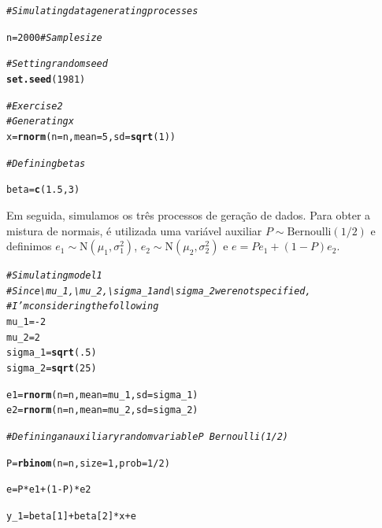 \documentclass{homework}\usepackage[]{graphicx}\usepackage[]{color}
\makeatletter
\newcommand{\hlnum}[1]{\textcolor[rgb]{0.686,0.059,0.569}{#1}}%
\newcommand{\hlcom}[1]{\textcolor[rgb]{0.678,0.584,0.686}{\textit{#1}}}%
\newcommand{\hlopt}[1]{\textcolor[rgb]{0,0,0}{#1}}%
\newcommand{\hlstd}[1]{\textcolor[rgb]{0.345,0.345,0.345}{#1}}%
\newcommand{\hlkwb}[1]{\textcolor[rgb]{0.69,0.353,0.396}{#1}}%
\newcommand{\hlkwc}[1]{\textcolor[rgb]{0.333,0.667,0.333}{#1}}%
\newcommand{\hlkwd}[1]{\textcolor[rgb]{0.737,0.353,0.396}{\textbf{#1}}}%
\newenvironment{kframe}{%
 \def\at@end@of@kframe{}%
 \ifinner\ifhmode%
  \def\at@end@of@kframe{\end{minipage}}%
  \begin{minipage}{\columnwidth}%
 \fi\fi%
 \def\FrameCommand##1{\hskip\@totalleftmargin \hskip-\fboxsep
 \colorbox{shadecolor}{##1}\hskip-\fboxsep
     \hskip-\linewidth \hskip-\@totalleftmargin \hskip\columnwidth}%
 \MakeFramed {\advance\hsize-\width
   \@totalleftmargin\z@ \linewidth\hsize
   \@setminipage}}%
 {\par\unskip\endMakeFramed%
 \at@end@of@kframe}
\newenvironment{knitrout}{}{} %
\makeatother
\begin{document}
\begin{knitrout}
\color{fgcolor}\begin{kframe}
\begin{alltt}
\hlcom{# Simulating data generating processes}

\hlstd{n} \hlkwb{=} \hlnum{2000} \hlcom{# Sample size}

\hlcom{# Setting random seed}
\hlkwd{set.seed}\hlstd{(}\hlnum{1981}\hlstd{)}

\hlcom{# Exercise 2}
\hlcom{# Generating x}
\hlstd{x} \hlkwb{=} \hlkwd{rnorm}\hlstd{(}\hlkwc{n} \hlstd{= n,} \hlkwc{mean} \hlstd{=} \hlnum{5}\hlstd{,} \hlkwc{sd} \hlstd{=} \hlkwd{sqrt}\hlstd{(}\hlnum{1}\hlstd{))}

\hlcom{# Defining betas}

\hlstd{beta} \hlkwb{=} \hlkwd{c}\hlstd{(}\hlnum{1.5}\hlstd{,} \hlnum{3}\hlstd{)}
\end{alltt}
\end{kframe}
\end{knitrout}

Em seguida, simulamos os três processos de geração de dados. Para obter a mistura de normais, é utilizada uma variável auxiliar $P \sim \mathrm{Bernoulli}(1/2)$ e definimos $e_1 \sim \mathrm{N}(\mu_1, \sigma_1^2)$, $e_2 \sim \mathrm{N}(\mu_2, \sigma_2^2)$ e $e = Pe_1 + (1-P)e_2$.

\begin{knitrout}
\color{fgcolor}\begin{kframe}
\begin{alltt}
\hlcom{# Simulating model 1}
\hlcom{# Since \textbackslash{}mu_1, \textbackslash{}mu_2, \textbackslash{}sigma_1 and \textbackslash{}sigma_2 were not specified,}
\hlcom{# I'm considering the following}
\hlstd{mu_1} \hlkwb{=} \hlopt{-}\hlnum{2}
\hlstd{mu_2} \hlkwb{=} \hlnum{2}
\hlstd{sigma_1} \hlkwb{=} \hlkwd{sqrt}\hlstd{(}\hlnum{.5}\hlstd{)}
\hlstd{sigma_2} \hlkwb{=} \hlkwd{sqrt}\hlstd{(}\hlnum{25}\hlstd{)}

\hlstd{e1} \hlkwb{=} \hlkwd{rnorm}\hlstd{(}\hlkwc{n} \hlstd{= n,} \hlkwc{mean} \hlstd{= mu_1,} \hlkwc{sd} \hlstd{= sigma_1)}
\hlstd{e2} \hlkwb{=} \hlkwd{rnorm}\hlstd{(}\hlkwc{n} \hlstd{= n,} \hlkwc{mean} \hlstd{= mu_2,} \hlkwc{sd} \hlstd{= sigma_2)}

\hlcom{# Defining an auxiliary random variable P ~ Bernoulli(1/2)}

\hlstd{P} \hlkwb{=} \hlkwd{rbinom}\hlstd{(}\hlkwc{n} \hlstd{= n,} \hlkwc{size} \hlstd{=} \hlnum{1}\hlstd{,} \hlkwc{prob} \hlstd{=} \hlnum{1}\hlopt{/}\hlnum{2}\hlstd{)}

\hlstd{e} \hlkwb{=} \hlstd{P} \hlopt{*} \hlstd{e1} \hlopt{+} \hlstd{(}\hlnum{1}\hlopt{-}\hlstd{P)} \hlopt{*} \hlstd{e2}

\hlstd{y_1} \hlkwb{=} \hlstd{beta[}\hlnum{1}\hlstd{]} \hlopt{+} \hlstd{beta[}\hlnum{2}\hlstd{]} \hlopt{*} \hlstd{x} \hlopt{+} \hlstd{e}
\end{alltt}
\end{kframe}
\end{knitrout}
\end{document}
